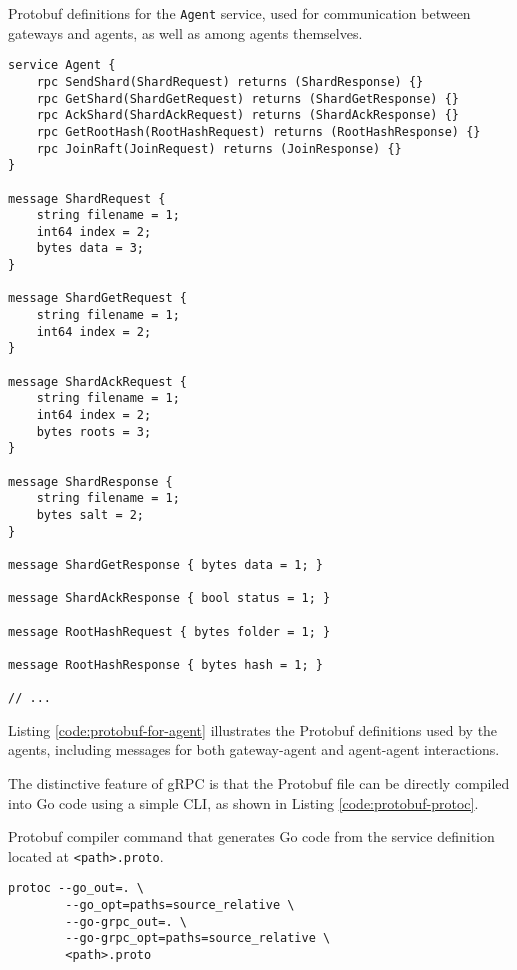 \begin{listing}[H]
\caption{Protobuf definitions for the \texttt{Agent} service, used for communication between gateways and agents, as well as among agents themselves.}
\label{code:protobuf-for-agent}
\begin{verbatim}
service Agent {
    rpc SendShard(ShardRequest) returns (ShardResponse) {}
    rpc GetShard(ShardGetRequest) returns (ShardGetResponse) {}
    rpc AckShard(ShardAckRequest) returns (ShardAckResponse) {}
    rpc GetRootHash(RootHashRequest) returns (RootHashResponse) {}
    rpc JoinRaft(JoinRequest) returns (JoinResponse) {}
}

message ShardRequest {
    string filename = 1;
    int64 index = 2;
    bytes data = 3;
}

message ShardGetRequest {
    string filename = 1;
    int64 index = 2;
}

message ShardAckRequest {
    string filename = 1;
    int64 index = 2;
    bytes roots = 3;
}

message ShardResponse {
    string filename = 1;
    bytes salt = 2;
}

message ShardGetResponse { bytes data = 1; }

message ShardAckResponse { bool status = 1; }

message RootHashRequest { bytes folder = 1; }

message RootHashResponse { bytes hash = 1; }

// ...
\end{verbatim}
\end{listing}

Listing \ref{code:protobuf-for-agent} illustrates the Protobuf definitions used by the agents, including messages for both gateway-agent and agent-agent interactions.

The distinctive feature of gRPC is that the Protobuf file can be directly compiled into Go code using a simple CLI, as shown in Listing \ref{code:protobuf-protoc}.

\begin{listing}
\caption{Protobuf compiler command that generates Go code from the service definition located at \texttt{<path>.proto}.}
\label{code:protobuf-protoc}
\begin{verbatim}
protoc --go_out=. \
        --go_opt=paths=source_relative \
        --go-grpc_out=. \
        --go-grpc_opt=paths=source_relative \
        <path>.proto
\end{verbatim}
\end{listing}


